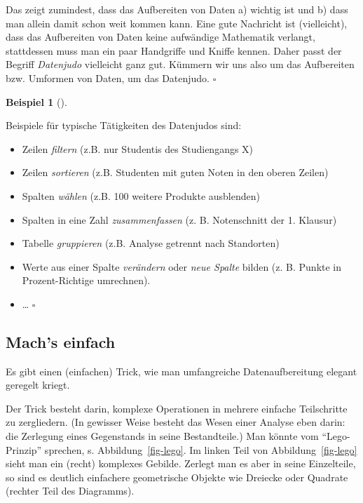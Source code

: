 \documentclass[
  letterpaper,
]{scrbook}
\providecommand{\tightlist}{%
  \setlength{\itemsep}{0pt}\setlength{\parskip}{0pt}}\usepackage{longtable,booktabs,array}
\theoremstyle{definition}
\theoremstyle{definition}
\newtheorem{example}{Beispiel}[chapter]
\theoremstyle{definition}
\theoremstyle{remark}
\begin{document}
Das zeigt zumindest, dass das Aufbereiten von Daten a) wichtig ist und
b) dass man allein damit schon weit kommen kann. Eine gute Nachricht ist
(vielleicht), dass das Aufbereiten von Daten keine aufwändige Mathematik
verlangt, stattdessen muss man ein paar Handgriffe und Kniffe kennen.
Daher passt der Begriff \emph{Datenjudo} vielleicht ganz gut. Kümmern
wir uns also um das Aufbereiten bzw. Umformen von Daten, um das
Datenjudo. \(\square\)

\begin{example}[]\protect\hypertarget{exm-datenjudo}{}\label{exm-datenjudo}

Beispiele für typische Tätigkeiten des Datenjudos sind:

\begin{itemize}
\tightlist
\item
  Zeilen \emph{filtern} (z.B. nur Studentis des Studiengangs X)
\item
  Zeilen \emph{sortieren} (z.B. Studenten mit guten Noten in den oberen
  Zeilen)
\item
  Spalten \emph{wählen} (z.B. 100 weitere Produkte ausblenden)
\item
  Spalten in eine Zahl \emph{zusammenfassen} (z. B. Notenschnitt der 1.
  Klausur)
\item
  Tabelle \emph{gruppieren} (z.B. Analyse getrennt nach Standorten)
\item
  Werte aus einer Spalte \emph{verändern} oder \emph{neue Spalte} bilden
  (z. B. Punkte in Prozent-Richtige umrechnen).
\item
  \ldots{} \(\square\)
\end{itemize}

\end{example}

\subsection{Mach's einfach}\label{machs-einfach}

Es gibt einen (einfachen) Trick, wie man umfangreiche Datenaufbereitung
elegant geregelt kriegt.

Der Trick besteht darin, komplexe Operationen in mehrere einfache
Teilschritte zu zergliedern. (In gewisser Weise besteht das Wesen einer
Analyse eben darin: die Zerlegung eines Gegenstands in seine
Bestandteile.) Man könnte vom \enquote{Lego-Prinzip} sprechen, s.
Abbildung~\ref{fig-lego}. Im linken Teil von Abbildung~\ref{fig-lego}
sieht man ein (recht) komplexes Gebilde. Zerlegt man es aber in seine
Einzelteile, so sind es deutlich einfachere geometrische Objekte wie
Dreiecke oder Quadrate (rechter Teil des Diagramms).
\end{document}
